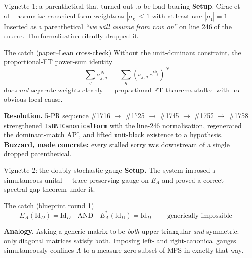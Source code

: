 \documentclass[aspectratio=169,10pt]{beamer}
\newcommand{\Id}{\mathrm{Id}}
\begin{document}
\begin{frame}{Vignette 1: a parenthetical that turned out to be load-bearing}
    \textbf{Setup.} Cirac et al.~\cite{Cirac2017Annals} normalise canonical-form weights as $|\mu_k| \leq 1$ with at least one $|\mu_1| = 1$. Inserted as a parenthetical \emph{``we will assume from now on''} on line 246 of the source. The formalisation silently dropped it.
    \vspace{0.3em}
    \begin{block}{The catch (paper--Lean cross-check)}
        \footnotesize
        Without the unit-dominant constraint, the proportional-FT power-sum identity
        \[
            \sum_q \mu_{j,q}^N \;=\; \sum_q (\nu_{j,q}\, e^{i\phi_j})^N
        \]
        does \emph{not} separate weights cleanly --- proportional-FT theorems stalled with no obvious local cause.
    \end{block}
    \vspace{0.2em}
    \textbf{Resolution.} 5-PR sequence \#1716 $\to$ \#1725 $\to$ \#1745 $\to$ \#1752 $\to$ \#1758 strengthened \texttt{IsBNTCanonicalForm} with the line-246 normalisation, regenerated the dominant-match API, and lifted unit-block existence to a hypothesis.
    \\
    \textcolor{amber}{\footnotesize \textbf{Buzzard, made concrete:} every stalled sorry was downstream of a single dropped parenthetical.}
\end{frame}

\begin{frame}{Vignette 2: the doubly-stochastic gauge}
    \textbf{Setup.} The system imposed a simultaneous unital + trace-preserving gauge on $E_A$ and proved a correct spectral-gap theorem under it.
    \vspace{0.3em}
    \begin{block}{The catch (blueprint round 1)}
        \[
            E_A(\Id_D) = \Id_D \quad\text{AND}\quad E_A^*(\Id_D) = \Id_D \quad\text{--- generically impossible.}
        \]
    \end{block}
    \vspace{0.2em}
    \textbf{Analogy.} Asking a generic matrix to be \emph{both} upper-triangular \emph{and} symmetric: only diagonal matrices satisfy both. Imposing left- and right-canonical gauges simultaneously confines $A$ to a measure-zero subset of MPS in exactly that way.
\end{frame}
\end{document}
